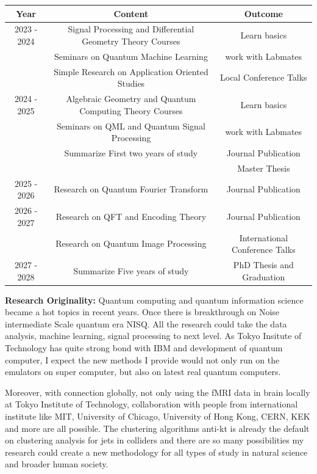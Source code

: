 \documentclass{article}
\begin{document}
\begin{center}
  \begin{tabular}{c|c|c}
    Year & Content & Outcome \\
    \hline
    2023 - 2024 &  Signal Processing and Differential Geometry Theory Courses& Learn basics \\
                &  Seminars on Quantum Machine Learning &  work with Labmates \\
                &  Simple Research on Application Oriented Studies & Local Conference Talks \\ 
    2024 - 2025 &  Algebraic Geometry and Quantum Computing Theory Courses & Learn basics \\
                &  Seminars on QML and Quantum Signal Processing  & work with Labmates \\
                &  Summarize First two years of study & Journal Publication \\
                & & Master Thesis \\
    \hline
    2025 - 2026 &  Research on Quantum Fourier Transform  & Journal Publication\\
    2026 - 2027 &  Research on QFT and Encoding Theory  & Journal Publication \\
    & Research on Quantum Image Processing & International Conference Talks \\
    2027 - 2028 &  Summarize Five years of study & PhD Thesis and Graduation 
  \end{tabular}
\end{center}


\textbf{Research Originality:}
Quantum computing and quantum information science became a hot topics in 
recent years. 
Once there is breakthrough on Noise intermediate Scale quantum era NISQ. All 
the research could take the data analysis, machine learning, signal processing 
to next level. As Tokyo Insitute of Technology has quite strong bond with 
IBM and development of quantum computer, I expect the new methods I provide 
would not only run on the emulators on super computer, but also on latest real 
quantum computers.

Moreover, with connection globally, not only using the fMRI data in brain locally 
at Tokyo Institute of Technology, collaboration with people from international 
institute like MIT, University of Chicago, University of Hong Kong, CERN, KEK and 
more are all possible. The clustering algorithms anti-kt is already the 
default on clustering analysis for jets in colliders and there are so 
many possibilities my research could create a new methodology for 
all types of study in natural science and broader human society. 
\end{document}

